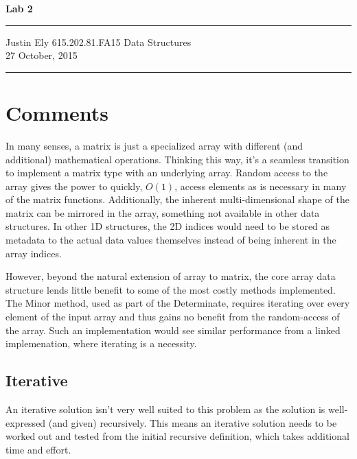 \documentclass[a4paper,12pt]{article}
\begin{document}
\begin{flushright}

\vspace{1.1cm}

{\bf\Huge Lab 2}

\rule{0.25\linewidth}{0.5pt}

\vspace{0.5cm}
Justin Ely
\linebreak
\newline
\footnotesize{615.202.81.FA15 Data Structures \\}
\vspace{0.5cm}
27 October, 2015
\end{flushright}

\noindent\rule{\linewidth}{1.0pt}


\section{Comments}
In many senses, a matrix is just a specialized array with different (and additional) mathematical operations.  Thinking this way, 
it's a seamless transition to implement a matrix type with an underlying array.  Random access to the array gives the power to quickly, 
$O(1)$, access elements as is necessary in many of the matrix functions.  Additionally, the inherent multi-dimensional shape of the 
matrix can be mirrored in the array, something not available in other data structures.  In other 1D structures, the 2D indices would need
to be stored as metadata to the actual data values themselves instead of being inherent in the array indices. 

However, beyond the natural extension of array to matrix, the core array data structure lends little benefit to some of the most costly
methods implemented.  The Minor method, used as part of the Determinate, requires iterating over every element of the input array
and thus gains no benefit from the random-access of the array.  Such an implementation would see similar performance from a
linked implemenation, where iterating is a necessity.  

\subsection{Iterative}
An iterative solution isn't very well suited to this problem as the solution is well-expressed (and given) recursively.  This means
an iterative solution needs to be worked out and tested from the initial recursive definition, which takes additional time and effort. 
\end{document}
